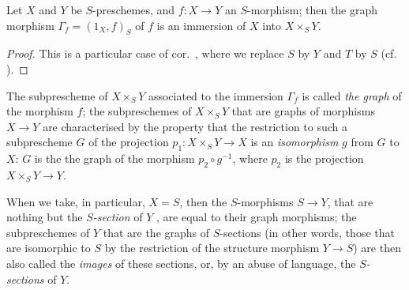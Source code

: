 \begin{cor}[5.3.11]
\label{1.5.3.11}
Let $X$ and $Y$ be $S$-preschemes, and $f:X\to Y$ an $S$-morphism;
then the graph morphism $\Gamma_f=(1_X,f)_S$ of $f$  is an immersion of $X$ into $X\times_S Y$.
\end{cor}

\begin{proof}
\label{proof-1.5.3.11}
This is a particular case of cor.~, where we replace $S$ by $Y$ and $T$ by $S$ (cf. ).
\end{proof}

The subprescheme of $X\times_S Y$ associated to the immersion $\Gamma_f$  is called \emph{the graph} of the morphism $f$;
the subpreschemes of $X\times_S Y$ that are graphs of morphisms $X\to Y$ are characterised by the property that the restriction to such a subprescheme $G$ of the projection $p_1:X\times_S Y\to X$ is an \emph{isomorphism} $g$ from $G$ to $X$:
$G$ is the the graph of the morphism $p_2\circ g^{-1}$, where $p_2$ is the projection $X\times_S Y\to Y$.

When we take, in particular, $X=S$, then the $S$-morphisms $S\to Y$, that are nothing but the \emph{$S$-section} of $Y$ , are equal to their graph morphisms;
the subpreschemes of $Y$ that are the graphs of $S$-sections (in other words, those that are isomorphic to $S$ by the restriction of the structure morphism $Y\to S$) are then also called the \emph{images} of these sections, or, by an abuse of language, the \emph{$S$-sections} of $Y$.

